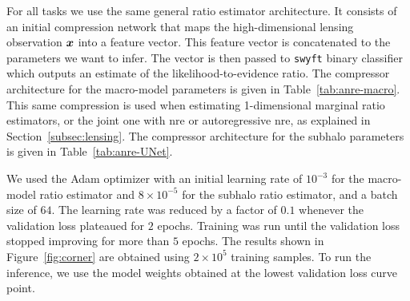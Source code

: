 \begin{subappendices}
 For all tasks we use the same general ratio estimator architecture. It consists of an initial compression network that maps the high-dimensional lensing observation $\bm{x}$ into a feature vector. This feature vector is concatenated to the parameters we want to infer. The vector is then passed to  \texttt{swyft} binary classifier which outputs an estimate of the likelihood-to-evidence ratio. The compressor architecture for the macro-model parameters is given in Table~\ref{tab:anre-macro}. This same compression is used when estimating 1-dimensional marginal ratio estimators, or the joint one with \gls*{nre} or autoregressive \gls*{nre}, as explained in Section~\ref{subsec:lensing}. The compressor architecture for the subhalo parameters is given in Table~\ref{tab:anre-UNet}.

We used the Adam optimizer with an initial learning rate of $10^{-3}$ for the macro-model ratio estimator and $8 \times 10^{-5}$ for the subhalo ratio estimator, and a batch size of $64$. The learning rate was reduced by a factor of $0.1$ whenever the validation loss plateaued for $2$ epochs. Training was run until the validation loss stopped improving for more than $5$ epochs. The results shown in Figure~\ref{fig:corner} are obtained using $2\times 10^5$ training samples. To run the inference, we use the model weights obtained at the lowest validation loss curve point.

\end{subappendices}
